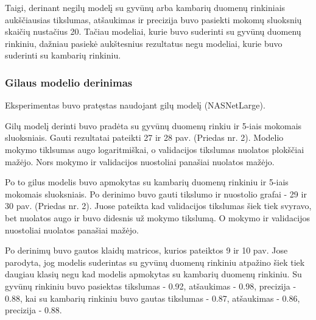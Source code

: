 \documentclass{VUMIFPSbakalaurinis}
\begin{document}
Taigi, derinant negilų modelį su gyvūnų arba kambarių duomenų rinkiniais aukščiausias tikslumas, atšaukimas ir precizija buvo pasiekti mokomų sluoksnių skaičių nustačius 20. Tačiau modeliai, kurie buvo suderinti su gyvūnų duomenų rinkiniu, dažniau pasiekė aukštesnius rezultatus negu modeliai, kurie buvo suderinti su kambarių rinkiniu. 

\subsubsection{Gilaus modelio derinimas}
Eksperimentas buvo pratęstas naudojant gilų modelį (NASNetLarge).

Gilų modelį derinti buvo pradėta su gyvūnų duomenų rinkiu ir 5-iais mokomais sluoksniais.
Gauti rezultatai pateikti 27 ir 28 pav. (Priedas nr. 2). Modelio mokymo tiklsumas augo logaritmiškai, o validacijos tikslumas nuolatos plokščiai mažėjo. Nors mokymo ir validacijos nuostoliai panašiai nuolatos mažėjo.

Po to gilus modelis buvo apmokytas su kambarių duomenų rinkiniu ir 5-iais mokomais sluoksniais.
Po derinimo buvo gauti tikslumo ir nuostolio grafai - 29 ir 30 pav. (Priedas nr. 2). Juose pateikta kad validacijos tikslumas šiek tiek svyravo, bet nuolatos augo ir buvo didesnis už mokymo tikslumą. O mokymo ir validacijos nuostoliai nuolatos panašiai mažėjo.

Po derinimų buvo gautos klaidų matricos, kurios pateiktos 9 ir 10 pav. Jose parodyta, jog modelis suderintas su gyvūnų duomenų rinkiniu atpažino šiek tiek daugiau klasių negu kad modelis apmokytas su kambarių duomenų rinkiniu.
Su gyvūnų rinkiniu buvo pasiektas tikslumas - 0.92, atšaukimas - 0.98, precizija - 0.88, kai su kambarių rinkiniu buvo gautas tikslumas - 0.87, atšaukimas - 0.86, precizija - 0.88.
\end{document}
